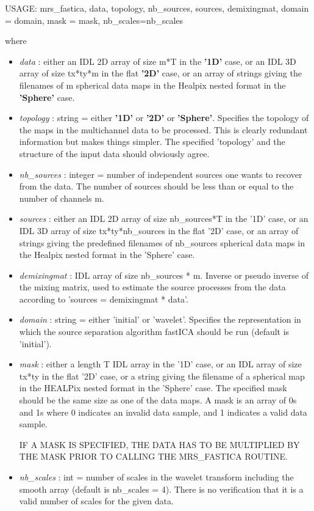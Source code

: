 {\bf
\begin{center}
     USAGE:  mrs\_fastica, data, topology, nb\_sources, sources, demixingmat, domain = domain, mask = mask, nb\_scales=nb\_scales
\end{center}}
where
\begin{itemize}
\item {\em data} : either an IDL 2D array of size m*T in the \textbf{'1D'} case, or an IDL 3D array 
of size tx*ty*m in the flat \textbf{'2D'} case, or an array of strings giving the filenames 
of m spherical data maps in the Healpix nested format in the \textbf{'Sphere'} case. 

\item {\em topology} : string = either \textbf{'1D'} or \textbf{'2D'} or \textbf{'Sphere'}. Specifies the topology 
of the maps in the multichannel data to be processed. This is clearly redundant information but makes things simpler. 
The specified 'topology' and the structure of the input data should obviously agree.

\item {\em nb\_sources} : integer = number of independent sources one wants to recover from the data. 
The number of sources should be less than or equal to the number of channels m.

\item {\em sources} : either an IDL 2D array of size nb\_sources*T in the '1D' case, or an IDL 3D array 
of size tx*ty*nb\_sources in the flat '2D' case, or an array of strings giving the predefined filenames 
of nb\_sources spherical data maps in the Healpix nested format in the 'Sphere' case. 

\item {\em demixingmat} : IDL array of size nb\_sources * m. Inverse or pseudo inverse of the mixing matrix, 
used to estimate the source processes from the data according to 'sources = demixingmat * data'.

\item {\em domain} : string = either 'initial' or 'wavelet'. Specifies the representation in which the source separation algorithm 
fastICA should be run (default is 'initial').	

\item {\em mask} : either a length T IDL array in the '1D' case, or an IDL array of size tx*ty in the flat '2D' case, 
or a string giving the filename of a spherical map in the HEALPix nested format in the 'Sphere' case. The specified 
mask should be the same size as one of the data maps. A mask is an array of 0s and 1s where 0 indicates an invalid 
data sample, and 1 indicates a valid data sample.

IF A MASK IS SPECIFIED, THE DATA HAS TO BE MULTIPLIED BY THE MASK PRIOR TO CALLING THE MRS\_FASTICA ROUTINE.

\item {\em nb\_scales} : int = number of scales in the wavelet transform including the smooth array (default is nb\_scales = 4).  There is no verification that it is a valid number of scales for the given data.

\end{itemize}


